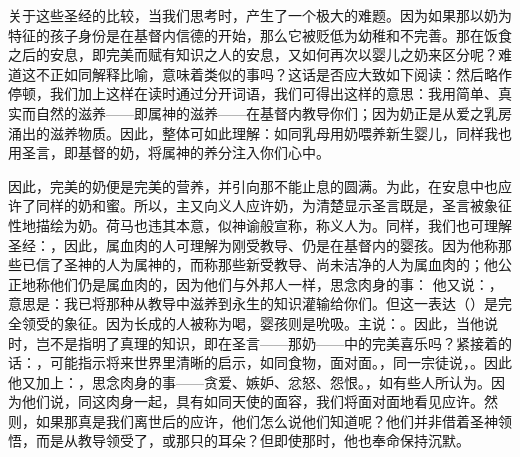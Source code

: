 关于这些圣经的比较，当我们思考时，产生了一个极大的难题。因为如果那以奶为特征的孩子身份是在基督内信德的开始，那么它被贬低为幼稚和不完善。那在饭食之后的安息，即完美而赋有知识之人的安息，又如何再次以婴儿之奶来区分呢？难道这不正如同解释比喻，意味着类似的事吗？这话是否应大致如下阅读：然后略作停顿，我们加上这样在读时通过分开词语，我们可得出这样的意思：我用简单、真实而自然的滋养——即属神的滋养——在基督内教导你们；因为奶正是从爱之乳房涌出的滋养物质。因此，整体可如此理解：如同乳母用奶喂养新生婴儿，同样我也用圣言，即基督的奶，将属神的养分注入你们心中。\par

因此，完美的奶便是完美的营养，并引向那不能止息的圆满。为此，在安息中也应许了同样的奶和蜜。所以，主又向义人应许奶，为清楚显示圣言既是，圣言被象征性地描绘为奶。荷马也违其本意，似神谕般宣称，称义人为。同样，我们也可理解圣经：，因此，属血肉的人可理解为刚受教导、仍是在基督内的婴孩。因为他称那些已信了圣神的人为属神的，而称那些新受教导、尚未洁净的人为属血肉的；他公正地称他们仍是属血肉的，因为他们与外邦人一样，思念肉身的事： 他又说：，意思是：我已将那种从教导中滋养到永生的知识灌输给你们。但这一表达（）是完全领受的象征。因为长成的人被称为喝，婴孩则是吮吸。主说：。因此，当他说时，岂不是指明了真理的知识，即在圣言——那奶——中的完美喜乐吗？紧接着的话：，可能指示将来世界里清晰的启示，如同食物，面对面。，同一宗徒说，。因此他又加上：，思念肉身的事——贪爱、嫉妒、忿怒、怨恨。，如有些人所认为。因为他们说，同这肉身一起，具有如同天使的面容，我们将面对面地看见应许。然则，如果那真是我们离世后的应许，他们怎么说他们知道呢？他们并非借着圣神领悟，而是从教导领受了，或那只的耳朵？但即使那时，他也奉命保持沉默。\par

